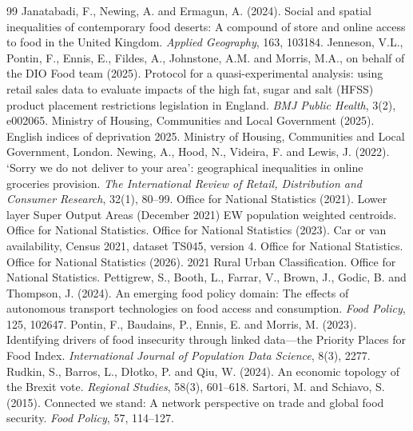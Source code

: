 \documentclass[11pt,a4paper]{article}
\begin{document}
\begin{thebibliography}{99}
 Janatabadi, F., Newing, A. and Ermagun, A. (2024). Social and spatial inequalities of contemporary food deserts: A compound of store and online access to food in the United Kingdom. \emph{Applied Geography}, 163, 103184.
 Jenneson, V.L., Pontin, F., Ennis, E., Fildes, A., Johnstone, A.M. and Morris, M.A., on behalf of the DIO Food team (2025). Protocol for a quasi-experimental analysis: using retail sales data to evaluate impacts of the high fat, sugar and salt (HFSS) product placement restrictions legislation in England. \emph{BMJ Public Health}, 3(2), e002065.
 Ministry of Housing, Communities and Local Government (2025). English indices of deprivation 2025. Ministry of Housing, Communities and Local Government, London.
 Newing, A., Hood, N., Videira, F. and Lewis, J. (2022). `Sorry we do not deliver to your area': geographical inequalities in online groceries provision. \emph{The International Review of Retail, Distribution and Consumer Research}, 32(1), 80--99.
 Office for National Statistics (2021). Lower layer Super Output Areas (December 2021) EW population weighted centroids. Office for National Statistics.
 Office for National Statistics (2023). Car or van availability, Census 2021, dataset TS045, version 4. Office for National Statistics.
 Office for National Statistics (2026). 2021 Rural Urban Classification. Office for National Statistics.
 Pettigrew, S., Booth, L., Farrar, V., Brown, J., Godic, B. and Thompson, J. (2024). An emerging food policy domain: The effects of autonomous transport technologies on food access and consumption. \emph{Food Policy}, 125, 102647.
 Pontin, F., Baudains, P., Ennis, E. and Morris, M. (2023). Identifying drivers of food insecurity through linked data---the Priority Places for Food Index. \emph{International Journal of Population Data Science}, 8(3), 2277.
 Rudkin, S., Barros, L., Dłotko, P. and Qiu, W. (2024). An economic topology of the Brexit vote. \emph{Regional Studies}, 58(3), 601--618.
 Sartori, M. and Schiavo, S. (2015). Connected we stand: A network perspective on trade and global food security. \emph{Food Policy}, 57, 114--127.

\end{thebibliography}
\end{document}
